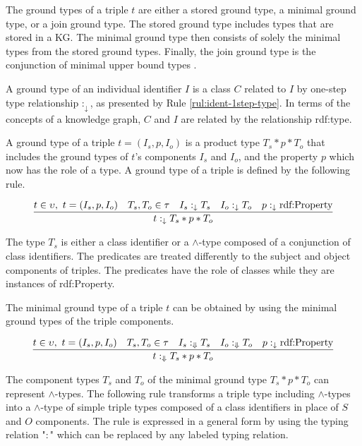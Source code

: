 \documentclass[runningheads]{llncs}
\newcommand{\darr}{\downarrow}
\newcommand{\Darr}{\Downarrow}
\begin{document}
%
% 

\noindent
The ground types of a triple $t$ are either a stored ground type, a
minimal ground type, or a join ground type. The stored ground type
includes types that are stored in a KG. The minimal ground type then
consists of solely the minimal types from the stored ground
types. Finally, the join ground type is the conjunction of minimal
upper bound types \cite{Knudstorp2024}.
 
A ground type of an individual identifier $I$ is a class $C$ related
to $I$ by one-step type relationship $:_\darr$, as presented by Rule
\ref{rul:ident-1step-type}. In terms of the concepts of a knowledge
graph, $C$ and $I$ are related by the relationship rdf:type.

A ground type of a triple $t=(I_s,p,I_o)$ is a product type
$T_s*p*T_o$ that includes the ground types of $t$'s components $I_s$
and $I_o$, and the property $p$ which now has the role of a type. A
ground type of a triple is defined by the following rule.

\begin{equation}
\label{rul:3-ground}
\dfrac{t\in\upsilon,\ t=(I_s,p,I_o)\quad T_s,T_o\in\tau\quad I_s:_\darr\/T_s\quad I_o:_\darr\/T_o\quad p:_\darr\text{rdf:Property}}
      {t:_\darr\/T_s*p*T_o}
\end{equation}

The type $T_s$ is either a class identifier or a $\land$-type composed
of a conjunction of class identifiers. The predicates are treated
differently to the subject and object components of triples. The
predicates have the role of classes while they are instances of
rdf:Property.

The minimal ground type of a triple $t$ can be obtained by using the
minimal ground types of the triple components. 

\begin{equation}
\label{rul:3-min-ground}
\dfrac{t\in\upsilon,\ t=(I_s,p,I_o)\quad T_s,T_o\in\tau\quad I_s:_\Darr\/T_s\quad I_o:_\Darr\/T_o\quad p:_\darr\text{rdf:Property}}
      {t:_\Darr\/T_s*p*T_o}
\end{equation}

The component types $T_s$ and $T_o$ of the minimal ground type
$T_s*p*T_o$ can represent $\land$-types. The following rule transforms
a triple type including $\land$-types into a $\land$-type of simple
triple types composed of a class identifiers in place of $S$ and $O$
components. The rule is expressed in a general form by using the
typing relation "$:$" which can be replaced by any labeled typing
relation.
\end{document}
